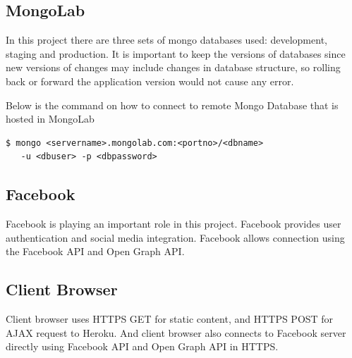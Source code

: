 \subsection{MongoLab}
In this project there are three sets of mongo databases used: development, staging and production. It is important to keep the versions of databases since new versions of changes may include changes in database structure, so rolling back or forward the application version would not cause any error. 

Below is the command on how to connect to remote Mongo Database that is hosted in MongoLab

\begin{lstlisting}
$ mongo <servername>.mongolab.com:<portno>/<dbname> 
   -u <dbuser> -p <dbpassword>
\end{lstlisting}

\subsection{Facebook}
Facebook is playing an important role in this project. Facebook provides user authentication and social media integration. Facebook allows connection using the Facebook API and Open Graph API.

\subsection{Client Browser}
Client browser uses HTTPS GET for static content, and HTTPS POST for AJAX request to Heroku. And client browser also connects to Facebook server directly using Facebook API and Open Graph API in HTTPS.
 
